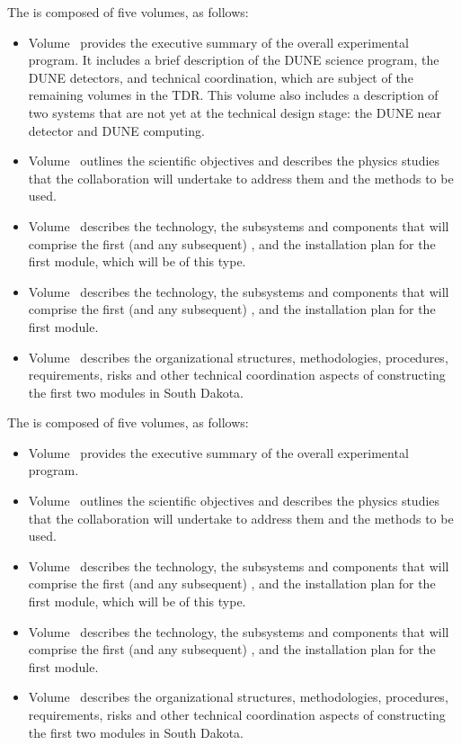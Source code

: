 The   is composed of five volumes, as follows:

\begin{itemize}
\item Volume~\volnumberexec{} provides the executive summary of the overall experimental program. It includes a brief description of the DUNE science program, the DUNE detectors, and technical coordination, which are subject of the remaining volumes in the TDR. This volume also includes a description of two systems that are not yet at the technical design stage: the DUNE near detector and DUNE computing.
\item Volume~\volnumberphysics{} outlines the scientific objectives and describes the physics studies that the  collaboration will undertake to address them and the methods to be used.
\item Volume~\volnumbersp{} describes the   technology, the subsystems and components that will comprise the first (and any subsequent)  , and the installation plan for the first  module, which will be of this type. 
\item Volume~\volnumberdp{} describes the   technology, the subsystems and components that will comprise the first (and any subsequent)  , and the installation plan for the first  module. 
\item Volume~\volnumbertc{} describes the organizational structures,  methodologies, procedures, requirements, risks and other technical  coordination aspects of constructing the first two  modules in South Dakota.
\end{itemize}

The   is composed of five volumes, as follows:

\begin{itemize}
\item Volume~\volnumberexec{} provides the executive summary of the overall  experimental program.
\item Volume~\volnumberphysics{} outlines the scientific objectives and describes the physics studies that the  collaboration will undertake to address them and the methods to be used.
\item Volume~\volnumbersp{} describes the   technology, the subsystems and components that will comprise the first (and any subsequent)  , and the installation plan for the first  module, which will be of this type. 
\item Volume~\volnumberdp{} describes the   technology, the subsystems and components that will comprise the first (and any subsequent)  , and the installation plan for the first  module. 
\item Volume~\volnumbertc{} describes the organizational structures,  methodologies, procedures, requirements, risks and other technical  coordination aspects of constructing the first two  modules in South Dakota.
\end{itemize}